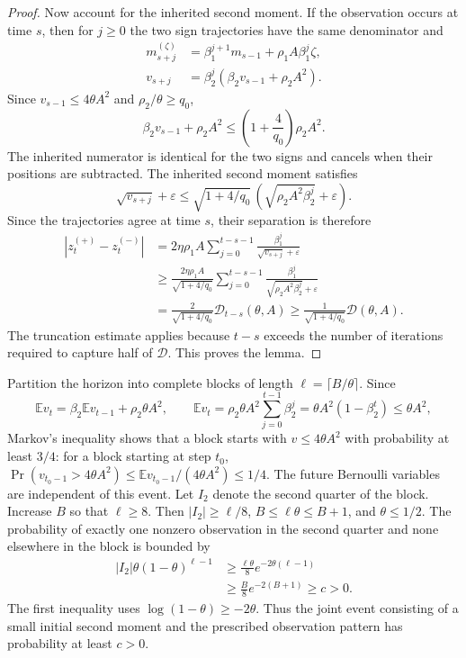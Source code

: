 \documentclass[11pt,letterpaper]{article}
\theoremstyle{definition}
\newcommand{\E}{\mathbb E}
\newcommand{\eps}{\varepsilon}
\begin{document}
\begin{proof}
Now account for the inherited second moment.  If the observation
occurs at time $s$, then for $j\ge0$ the two sign trajectories have the
same denominator and
\begin{align*}
m_{s+j}^{(\zeta)}&=\beta_1^{j+1}m_{s-1}+\rho_1A\beta_1^j\zeta,\\
v_{s+j}&=\beta_2^j(\beta_2v_{s-1}+\rho_2A^2).
\end{align*}
Since $v_{s-1}\le4\theta A^2$ and $\rho_2/\theta\ge q_0$,
\[
\beta_2v_{s-1}+\rho_2A^2
\le\left(1+\frac{4}{q_0}\right)\rho_2A^2.
\]
The inherited numerator is identical for the two signs and cancels when
their positions are subtracted. The inherited second moment satisfies
\[
\sqrt{v_{s+j}}+\eps
\le\sqrt{1+4/q_0}\,
\left(\sqrt{\rho_2A^2\beta_2^j}+\eps\right).
\]
Since the trajectories agree at time $s$, their separation is therefore
\begin{align*}
|z_t^{(+)}-z_t^{(-)}|
&=2\eta\rho_1A\sum_{j=0}^{t-s-1}
\frac{\beta_1^j}{\sqrt{v_{s+j}}+\eps}\\
&\ge\frac{2\eta\rho_1A}{\sqrt{1+4/q_0}}
\sum_{j=0}^{t-s-1}
\frac{\beta_1^j}{\sqrt{\rho_2A^2\beta_2^j}+\eps}\\
&=\frac{2}{\sqrt{1+4/q_0}}\mathcal D_{t-s}(\theta,A)
\ge\frac{1}{\sqrt{1+4/q_0}}\mathcal D(\theta,A).
\end{align*}
The truncation estimate applies because $t-s$ exceeds the number of
iterations required to capture half of $\mathcal D$. This proves the lemma.
\end{proof}

Partition the horizon into complete blocks of length
$\ell=\lceil B/\theta\rceil$. Since
\[
\E v_t=\beta_2\E v_{t-1}+\rho_2\theta A^2,
\qquad
\E v_t=\rho_2\theta A^2\sum_{j=0}^{t-1}\beta_2^j
=\theta A^2(1-\beta_2^t)\le\theta A^2,
\]
Markov's inequality shows that a block starts with
$v\le4\theta A^2$ with probability at least
$3/4$: for a block starting at step $t_0$,
$\Pr(v_{t_0-1}>4\theta A^2)\le\E v_{t_0-1}/(4\theta A^2)\le1/4$.
The future Bernoulli variables are independent of this event.
Let $I_2$ denote the second quarter of the block.
Increase $B$ so that $\ell\ge8$.
Then $|I_2|\ge\ell/8$, $B\le\ell\theta\le B+1$, and $\theta\le1/2$.
The probability of exactly one nonzero observation in the second quarter
and none elsewhere in the block is bounded by
\begin{equation}
\begin{aligned}
|I_2|\theta(1-\theta)^{\ell-1}
&\ge\frac{\ell\theta}{8}e^{-2\theta(\ell-1)}\\
&\ge\frac B8e^{-2(B+1)}\ge c>0.
\end{aligned}
\label{eq:block-pattern-probability}
\end{equation}
The first inequality uses $\log(1-\theta)\ge-2\theta$.
Thus the joint event consisting of a small initial second moment and
the prescribed observation pattern has probability at least $c>0$.
\end{document}

